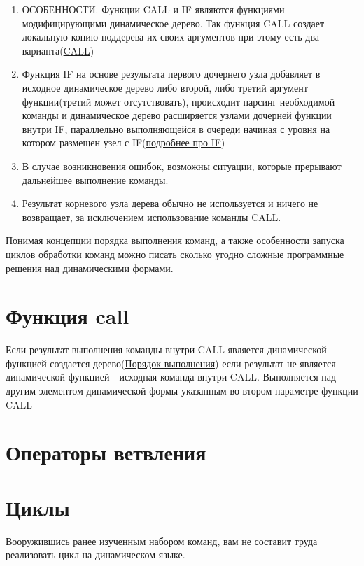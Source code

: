\documentclass[10pt]{book}
\begin{document}
\begin{enumerate}
            \item ОСОБЕННОСТИ. Функции CALL и IF являются функциями модифицирующими динамическое дерево. Так функция CALL создает локальную копию поддерева их своих аргументов при этому есть два варианта(\hyperref[sec:fcall]{CALL})
            \item Функция IF на основе результата первого дочернего узла добавляет в исходное динамическое дерево либо второй, либо третий аргумент функции(третий может отсутствовать), происходит парсинг необходимой команды и динамическое дерево расширяется узлами дочерней функции внутри IF, параллельно выполняющейся в очереди начиная с уровня на котором размещен узел с IF(\hyperref[sec:fif]{подробнее про IF})
            \item В случае возникновения ошибок, возможны ситуации, которые прерывают дальнейшее выполнение команды.
            \item Результат корневого узла дерева обычно не используется и ничего не возвращает, за исключением  использование команды CALL.
        \end{enumerate}

        Понимая концепции порядка выполнения команд, а также особенности запуска циклов обработки команд можно писать сколько угодно сложные программные решения над динамическими формами.
    
    \section{Функция call}\label{sec:fcall}
        Если результат выполнения команды внутри CALL является динамической функцией создается дерево(\hyperref[sec:execrules]{Порядок выполнения}) если результат не является динамической функцией - исходная команда внутри CALL. Выполняется над другим элементом динамической формы указанным во втором параметре функции CALL

	\section{Операторы ветвления}\label{sec:fif}
	
	\section{Циклы}
	\label{sec:loops}
	
	Вооружившись ранее изученным набором команд, вам не составит труда реализовать цикл на динамическом языке.
	
\end{document}
